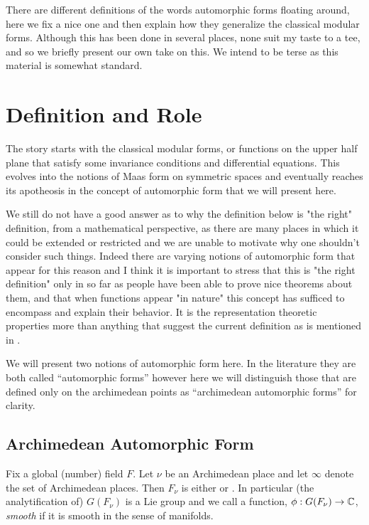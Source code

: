 There are different definitions of the words automorphic forms floating around, here we fix a nice one and then explain how they generalize the classical modular forms. Although this has been done in several places, none suit my taste to a tee, and so we briefly present our own take on this. We intend to be terse as this material is somewhat standard.

\section{Definition and Role}
The story starts with the classical modular forms, or functions on the upper half plane that satisfy some invariance conditions and differential equations. This evolves into the notions of Maas form on symmetric spaces and eventually reaches its apotheosis in the concept of automorphic form that we will present here. 

We still do not have a good answer as to why the definition below is "the right" definition, from a mathematical perspective, as there are many places in which it could be extended or restricted and we are unable to motivate why one shouldn't consider such things. Indeed there are varying notions of automorphic form that appear for this reason and I think it is important to stress that this is "the right definition" only in so far as people have been able to prove nice theorems about them, and that when functions appear "in nature" this concept has sufficed to encompass and explain their behavior. It is the representation theoretic properties more than anything that suggest the current definition as is mentioned in \cite[1.II.3]{borelAutomorphicFormsRepresentations1979}.

We will present two notions of automorphic form here. In the literature they are both called ``automorphic forms'' however here we will distinguish those that are defined only on the archimedean points as ``archimedean automorphic forms'' for clarity.

\subsection{Archimedean Automorphic Form}
Fix a global (number) field \(F\). Let \(\nu\) be an Archimedean place and let \(\infty\) denote the set of Archimedean places. Then \(F_\nu\) is either \R or \C. In particular (the analytification of) \(G(F_\nu)\) is a Lie group and we call a function, \(\phi: G(F_\nu) \to \C\), \textit{smooth}  if it is smooth in the sense of manifolds.


